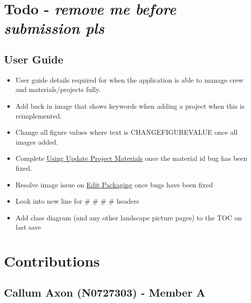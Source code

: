 \documentclass[
  english,
  a4paper,
,tablecaptionabove
]{scrartcl}
\providecommand{\tightlist}{%
  \setlength{\itemsep}{0pt}\setlength{\parskip}{0pt}}
\begin{document}
\newpage

\hypertarget{todo---remove-me-before-submission-pls}{%
\section{\texorpdfstring{Todo - \textbf{\emph{remove me before
submission
pls}}}{Todo - remove me before submission pls}}\label{todo---remove-me-before-submission-pls}}

\hypertarget{user-guide}{%
\subsection{User Guide}\label{user-guide}}

\begin{itemize}
\tightlist
\item
  User guide details required for when the application is able to manage
  crew and materials/projects fully.
\item
  Add back in image that shows keywords when adding a project when this
  is reimplemented.
\item
  Change all figure values where text is CHANGEFIGUREVALUE once all
  images added.
\item
  Complete \protect\hyperlink{using-update-project-materials}{Using
  Update Project Materials} once the material id bug has been fixed.
\item
  Resolve image issue on \protect\hyperlink{edit-packaging}{Edit
  Packaging} once bugs have been fixed
\item
  Look into new line for \# \# \# \# headers
\item
  Add class diagram (and any other landscape picture pages) to the TOC
  on last save
\end{itemize}

\newpage

\hypertarget{contributions}{%
\section{Contributions}\label{contributions}}

\hypertarget{callum-axon-n0727303---member-a}{%
\subsection{Callum Axon (N0727303) - Member
A}\label{callum-axon-n0727303---member-a}}
\end{document}

